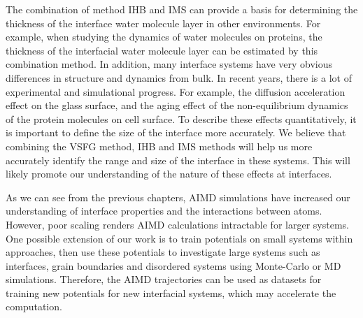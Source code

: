 The combination of method IHB and IMS can provide a basis for determining the thickness of the interface water molecule layer in other environments. 
For example, when studying the dynamics of water molecules on proteins, the thickness of the interfacial water molecule layer can be estimated by this combination method.
In addition, many interface systems have very obvious differences in structure and dynamics from bulk.
In recent years, there is a lot of experimental and simulational progress. For example, the diffusion acceleration effect on the glass surface\cite{ZhuL11,ZhangWei16}, 
and the aging effect of the non-equilibrium dynamics of the protein molecules on cell surface\cite{HuXiaohu16}. 
To describe these effects quantitatively, it is important to define the size of the interface more accurately. 
We believe that combining the VSFG method, IHB and IMS methods will help us more accurately identify the range and size of the interface in these systems.
This will likely promote our understanding of the nature of these effects at interfaces.

As we can see from the previous chapters, AIMD simulations have increased our understanding of interface properties and the interactions between atoms.
However, poor scaling renders AIMD calculations intractable for larger systems.
One possible extension of our work is to train potentials on small systems within \abinitio approaches\cite{Behler2007,Behler2011,Behler2014,Kolb2017}, 
then use these potentials to investigate large systems such as interfaces, grain boundaries and disordered systems using Monte-Carlo or MD simulations.
Therefore, the AIMD trajectories can be used as datasets for training new potentials for new interfacial systems, 
which may accelerate the computation.


